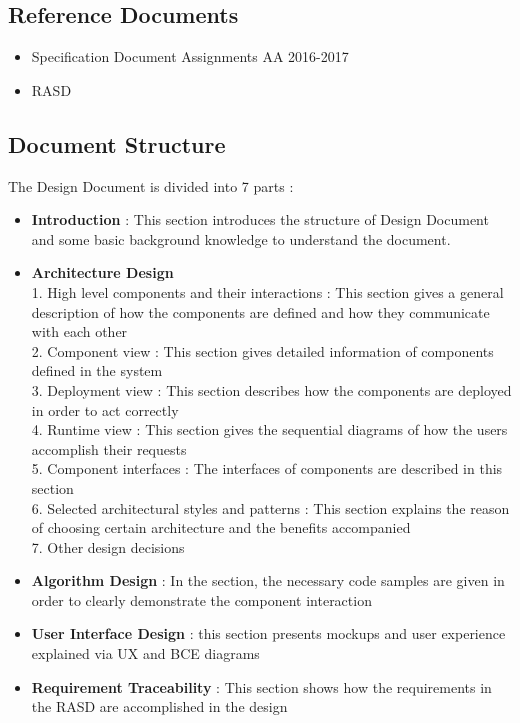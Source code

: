 \documentclass{article}
\begin{document}
	\subsection{Reference Documents}
	\begin{itemize}
		\item Specification Document Assignments AA 2016-2017
		\item RASD
	\end{itemize}
	\newpage
	\subsection{Document Structure}
	The Design Document is divided into 7 parts : 
	\begin{itemize}
		\item \textbf{Introduction} : This section introduces the structure of Design Document and some basic background knowledge to understand the document.
		\item \textbf{Architecture Design}
		\\1. High level components and their interactions : This section gives a general description of how the components are defined and how they communicate with each other  
		\\2. Component view : This section gives detailed information of components defined in the system
		\\3. Deployment view : This section describes how the components are deployed in order to act correctly
		\\4. Runtime view : This section gives the sequential diagrams of how the users accomplish their requests
		\\5. Component interfaces : The interfaces of components are described in this section
		\\6. Selected architectural styles and patterns : This section explains the reason of choosing certain architecture and the benefits accompanied
		\\7. Other design decisions
		\item \textbf{Algorithm Design} : In the section, the necessary code samples are given in order to clearly demonstrate the component interaction 
		\item \textbf{User Interface Design} : this section presents mockups and user experience explained via UX and BCE diagrams
		\item \textbf{Requirement Traceability} : This section shows how the requirements in the RASD are accomplished in the design
	\end{itemize}
	\newpage
\end{document}

